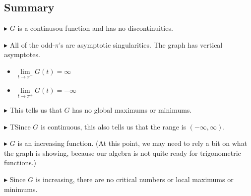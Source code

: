 \documentclass{ximera}
\begin{document}
\subsection{Summary}

$\blacktriangleright$ $G$ is a continusou function and has no discontinuities.  

$\blacktriangleright$ All of the odd-$\pi$'s are asymptotic singularities.  The graph has vertical asymptotes.


\begin{itemize}
\item $\lim\limits_{t \to \pi^{-}}G(t) = \infty$ 

\item $\lim\limits_{t \to \pi^{+}}G(t) = -\infty$ 
\end{itemize}


$\blacktriangleright$ This tells us that $G$ has no global maximums or minimums.  

$\blacktriangleright$ TSince $G$ is continuous, this also tells us that the range is $(-\infty, \infty)$.  




$\blacktriangleright$ $G$ is an increasing function. (At this point, we may need to rely a bit on what the graph is showing, because our algebra is not quite ready for trigonometric functions.)

$\blacktriangleright$ Since $G$ is increasing, there are no critical numbers or local maximums or minimums.
\end{document}
